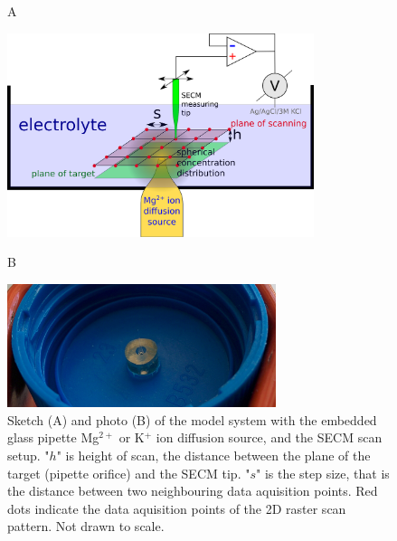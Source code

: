 \begin{figure}
\centering
\begin{flushleft}
\hspace{1.5cm} A
\end{flushleft}

\includegraphics[width=0.8\textwidth]{img/setup.eps}\vspace{5mm}

\begin{flushleft}
\hspace{1.5cm} B
\end{flushleft}

\includegraphics[width=0.7\textwidth]{img/pipette_source.jpg}
\caption[Sketch and photo of the model system with the embedded glass pipette Mg$^{2+}$ or K$^+$ ion diffusion source, and the SECM scan setup.]{Sketch (A) and photo (B) of the model system with the embedded glass pipette Mg$^{2+}$ or K$^+$ ion diffusion source, and the SECM scan setup.
"$h$" is height of scan, the distance between the plane of the target (pipette orifice) and the SECM tip.
"$s$" is the step size, that is the distance between two neighbouring data aquisition points.
Red dots indicate the data aquisition points of the 2D raster scan pattern.
Not drawn to scale.}
\label{fig:setup}
\end{figure}

